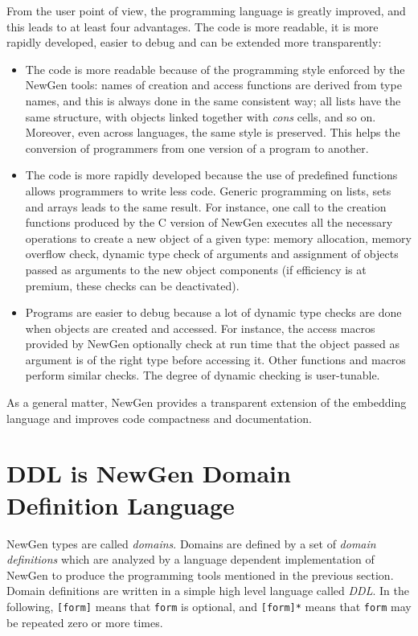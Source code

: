From the user point of view, the programming language is greatly
improved, and this leads to at least four advantages. The code is more
readable, it is more rapidly developed, easier to debug and can be
extended more transparently:
\begin{itemize}
\item
        The code is more readable because of the programming style
enforced by the NewGen tools: names of creation and access functions are
derived from type names, and this is always done in the same consistent
way; all lists have the same structure, with objects linked together
with {\em cons} cells, and so on. Moreover, even across languages, the
same style is preserved.  This helps the conversion of programmers from
one version of a program to another.
\item
        The code is more rapidly developed because the use of
predefined functions allows programmers to write less code. Generic
programming on lists, sets and arrays leads to the same result. For
instance, one call to the creation functions produced by the C version
of NewGen executes all the necessary operations to create a new object
of a given type: memory allocation, memory overflow check, dynamic type
check of arguments and assignment of objects passed as arguments to the
new object components (if efficiency is at premium, these checks can be
deactivated).
\item
        Programs are easier to debug because a lot of dynamic type
checks are done when objects are created and accessed. For instance, the
access macros provided by NewGen optionally check at run time that the
object passed as argument is of the right type before accessing it.
Other functions and macros perform similar checks. The degree of dynamic
checking is user-tunable.
\end{itemize}

As a general matter, NewGen provides a transparent extension of
the embedding language and improves code compactness and documentation.

\section{DDL is NewGen Domain Definition Language}

NewGen types are called {\em domains}. Domains are defined by a set of
{\em domain definitions} which are analyzed by a language dependent
implementation of NewGen to produce the programming tools mentioned in
the previous section. Domain definitions are written in a simple high
level language called {\em DDL}.  In the following, {\tt [form]} means
that {\tt form} is optional, and {\tt [form]*} means that {\tt form}
may be repeated zero or more times.

